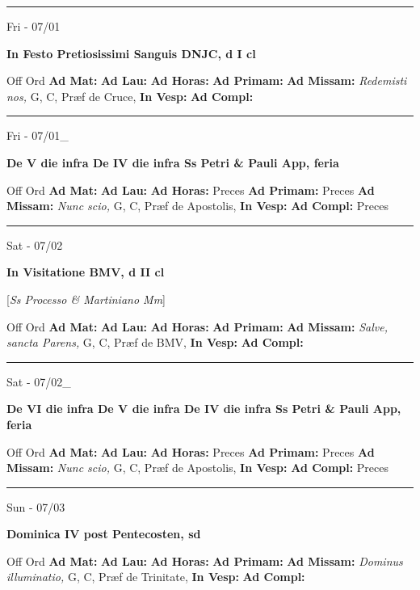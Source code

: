 \documentclass[letterpaper, 10pt]{article}
\begin{document}
\hrule
\begin{center}
Fri - 07/01
\end{center}\textbf{ \large In Festo Pretiosissimi Sanguis DNJC, \textnormal{\normalsize d I cl}}
\begin{justify}
Off Ord
\textbf{Ad Mat: }
\textbf{Ad Lau: }
\textbf{Ad Horas: }
\textbf{Ad Primam: }
\textbf{Ad Missam:} \textit{Redemisti nos, } G, C, Præf de Cruce, 
\textbf{In Vesp: }
\textbf{Ad Compl: }\end{justify}



\hrule
\begin{center}
Fri - 07/01\_
\end{center}\textbf{ \large De V die infra De IV die infra Ss Petri \& Pauli App, \textnormal{\normalsize feria}}
\begin{justify}
Off Ord
\textbf{Ad Mat: }
\textbf{Ad Lau: }
\textbf{Ad Horas: }Preces
\textbf{Ad Primam: }Preces
\textbf{Ad Missam:} \textit{Nunc scio, } G, C, Præf de Apostolis, 
\textbf{In Vesp: }
\textbf{Ad Compl: }Preces\end{justify}



\hrule
\begin{center}
Sat - 07/02
\end{center}\textbf{ \large In Visitatione BMV, \textnormal{\normalsize d II cl}}

[\textit{Ss Processo \& Martiniano Mm}]
\begin{justify}
Off Ord
\textbf{Ad Mat: }
\textbf{Ad Lau: }
\textbf{Ad Horas: }
\textbf{Ad Primam: }
\textbf{Ad Missam:} \textit{Salve, sancta Parens, } G, C, Præf de BMV, 
\textbf{In Vesp: }
\textbf{Ad Compl: }\end{justify}



\hrule
\begin{center}
Sat - 07/02\_
\end{center}\textbf{ \large De VI die infra De V die infra De IV die infra Ss Petri \& Pauli App, \textnormal{\normalsize feria}}
\begin{justify}
Off Ord
\textbf{Ad Mat: }
\textbf{Ad Lau: }
\textbf{Ad Horas: }Preces
\textbf{Ad Primam: }Preces
\textbf{Ad Missam:} \textit{Nunc scio, } G, C, Præf de Apostolis, 
\textbf{In Vesp: }
\textbf{Ad Compl: }Preces\end{justify}



\hrule
\begin{center}
Sun - 07/03
\end{center}\textbf{ \large Dominica IV post Pentecosten, \textnormal{\normalsize sd}}
\begin{justify}
Off Ord
\textbf{Ad Mat: }
\textbf{Ad Lau: }
\textbf{Ad Horas: }
\textbf{Ad Primam: }
\textbf{Ad Missam:} \textit{Dominus illuminatio, } G, C, Præf de Trinitate, 
\textbf{In Vesp: }
\textbf{Ad Compl: }\end{justify}
\end{document}
